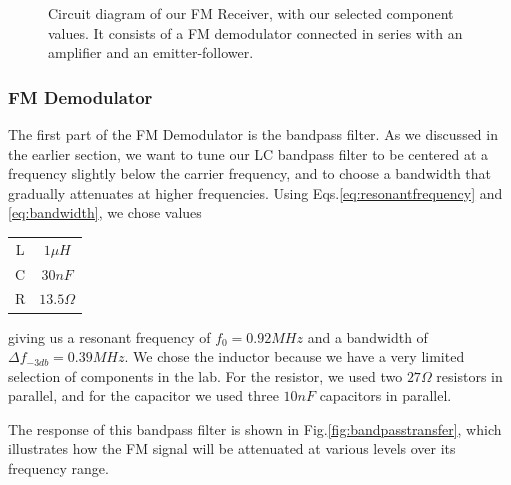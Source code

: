\documentclass[12pt]{article}
\begin{document}
\begin{figure}[H]
\caption{Circuit diagram of our FM Receiver, with our selected component values. It consists of a FM demodulator connected in series with an amplifier and an emitter-follower.}
\label{fig:circuitdiagram}
\end{figure}

\subsubsection*{FM Demodulator}
The first part of the FM Demodulator is the bandpass filter. As we discussed in the earlier section, we want to tune our LC bandpass filter to be centered at a frequency slightly below the carrier frequency, and to choose a bandwidth that gradually attenuates at higher frequencies. Using Eqs.\ref{eq:resonantfrequency} and \ref{eq:bandwidth}, we chose values

\begin{center}
  \begin{tabular}{ c  c }
    L & $1\mu H$ \\
    C & $30nF$ \\
    R & $13.5\Omega$ 
  \end{tabular}
\end{center}
giving us a resonant frequency of $f_0 = 0.92 MHz$ and a bandwidth of $\Delta{f}_{-3db} = 0.39 MHz$. We chose the inductor because we have a very limited selection of components in the lab. For the resistor, we used two $27\Omega$ resistors in parallel, and for the capacitor we used three $10nF$ capacitors in parallel.

The response of this bandpass filter is shown in Fig.\ref{fig:bandpasstransfer}, which illustrates how the FM signal will be attenuated at various levels over its frequency range.
\end{document}

